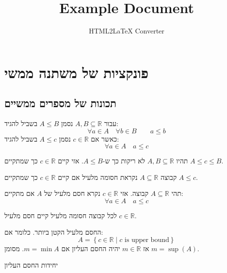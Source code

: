 \documentclass{tstextbook}
\begin{document}
\title{Example Document}
\author{HTML2LaTeX Converter}
\maketitle

\section{פונקציות של משתנה ממשי}

\subsection{תכונות של מספרים ממשיים}

\begin{symbolize}
עבור \(A, B\subseteq \mathbb{R}\) נסמן \(A\leq B\) בשביל להגיד:
$$\forall a \in A\quad \forall b \in B\qquad a\leq b$$
כאשר אם \(c \in \mathbb{R}\) נסמן \(A\leq c\) בשביל להגיד:
$$\forall a \in A\quad a\leq c$$

\end{symbolize}
\begin{definition}
תהיו \(A,B \subseteq \mathbb{R}\) לא ריקות כך ש-\(A\leq B\). אזי קיים \(c \in \mathbb{R}\) כך שמתקיים \(A\leq c \leq B\).

\end{definition}
\begin{definition}
קבוצה \(A\subseteq \mathbb{R}\) נקראת חסומה מלעיל אם קיים \(c \in \mathbb{R}\) כך שמתקיים \(A\leq c\).

\end{definition}
\begin{definition}
תהי \(A\subseteq \mathbb{R}\) קבוצה. אזי \(c \in \mathbb{R}\) נקרא חסם מלעיל של \(A\) אם מתקיים:
$$\forall a \in A\quad  a \leq c$$

\end{definition}
\begin{proposition}
לכל קבוצה חסומה מלעיל קיים חסם מלעיל \(c \in \mathbb{R}\).

\end{proposition}
\begin{definition}
החסם מלעיל הקטן ביותר. כלומר אם:
$$A=\left\{  c \in \mathbb{R}\mid c \text{ is upper bound}  \right\}$$
אז \(m \in \mathbb{R}\) יהיה החסם העליון אם \(m=\min A\). מסומן \(m=\sup(A)\).

\end{definition}
\begin{proposition}
יחידות החסם העליון

\end{proposition}
\end{document}
